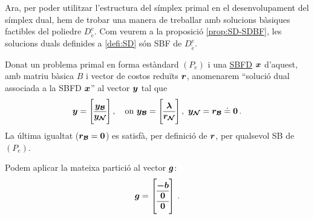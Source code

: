 Ara, per poder utilitzar l'estructura del símplex primal en el desenvolupament del símplex dual, hem de trobar una manera de treballar amb solucions bàsiques factibles del poliedre $D^e_{\tilde{e}}$. Com veurem a la proposició \ref{prop:SD-SDBF}, les solucions duals definides a \ref{defi:SD} són SBF de $D^e_{\tilde{e}}$. 

\begin{defi}\label{defi:SD}
	Donat un problema primal en forma estàndard $(P_e)$ i una \hyperref[defi:SBFD]{SBFD} $\boldsymbol{x}$ d'aquest, amb matriu bàsica $B$ i vector de costos reduïts $\boldsymbol{r}$, anomenarem ``solució dual associada a la SBFD $\boldsymbol{x}$'' al vector $\boldsymbol{y}$ tal que
	\[
		\vb{y} = 
		\left[\begin{array}{@{}c@{}}
		\vb{y_\B}\\
		\hline
		\vb{y_\N}
		\end{array}\right],\quad\text{on }
		\vb{y_\B}=
		\left[\begin{array}{@{}c@{}}
			\vb{\lambda}\\
			\hline
			\vb{r_\N}
		\end{array}\right],\ 
		\vb{y_\N} = \vb{r_\B} \doteq \vb{0}\,.	
	\]
	La última igualtat ($\boldsymbol{r_{\mathcal{B}}}=\boldsymbol{0}$) es satisfà, per definició de $\boldsymbol{r}$, per qualsevol SB de $(P_e)$.
\end{defi}


Podem aplicar la mateixa partició al vector $\boldsymbol{g}$:
\[
\vb{g} = 
\left[\begin{array}{@{}c@{}}
\vb{-b}\\
\hline
\vb{0}\\
\hline
\vb{0}
\end{array}\right]\,.
\]

